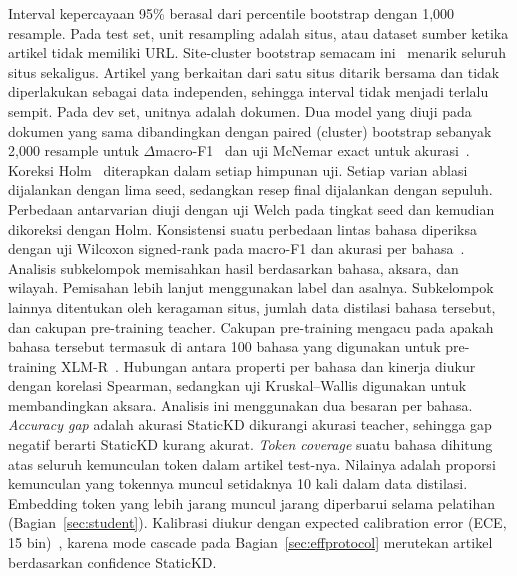 \documentclass[journal]{IEEEtran}
\begin{document}
Interval kepercayaan 95\% berasal dari percentile bootstrap dengan 1,000 resample. Pada test set, unit resampling adalah situs, atau dataset sumber ketika artikel tidak memiliki URL. Site-cluster bootstrap semacam ini~\cite{field2007bootstrapping} menarik seluruh situs sekaligus. Artikel yang berkaitan dari satu situs ditarik bersama dan tidak diperlakukan sebagai data independen, sehingga interval tidak menjadi terlalu sempit. Pada dev set, unitnya adalah dokumen. Dua model yang diuji pada dokumen yang sama dibandingkan dengan paired (cluster) bootstrap sebanyak 2,000 resample untuk $\Delta$macro-F1~\cite{koehn2004significance} dan uji McNemar exact untuk akurasi~\cite{mcnemar1947}. Koreksi Holm~\cite{holm1979} diterapkan dalam setiap himpunan uji. Setiap varian ablasi dijalankan dengan lima seed, sedangkan resep final dijalankan dengan sepuluh. Perbedaan antarvarian diuji dengan uji Welch pada tingkat seed dan kemudian dikoreksi dengan Holm. Konsistensi suatu perbedaan lintas bahasa diperiksa dengan uji Wilcoxon signed-rank pada macro-F1 dan akurasi per bahasa~\cite{dror2018hitchhiker}. Analisis subkelompok memisahkan hasil berdasarkan bahasa, aksara, dan wilayah. Pemisahan lebih lanjut menggunakan label dan asalnya. Subkelompok lainnya ditentukan oleh keragaman situs, jumlah data distilasi bahasa tersebut, dan cakupan pre-training teacher. Cakupan pre-training mengacu pada apakah bahasa tersebut termasuk di antara 100 bahasa yang digunakan untuk pre-training XLM-R~\cite{conneau2020xlmr}. Hubungan antara properti per bahasa dan kinerja diukur dengan korelasi Spearman, sedangkan uji Kruskal--Wallis digunakan untuk membandingkan aksara. Analisis ini menggunakan dua besaran per bahasa. \emph{Accuracy gap} adalah akurasi StaticKD dikurangi akurasi teacher, sehingga gap negatif berarti StaticKD kurang akurat. \emph{Token coverage} suatu bahasa dihitung atas seluruh kemunculan token dalam artikel test-nya. Nilainya adalah proporsi kemunculan yang tokennya muncul setidaknya 10 kali dalam data distilasi. Embedding token yang lebih jarang muncul jarang diperbarui selama pelatihan (Bagian~\ref{sec:student}). Kalibrasi diukur dengan expected calibration error (ECE, 15 bin)~\cite{guo2017calibration}, karena mode cascade pada Bagian~\ref{sec:effprotocol} merutekan artikel berdasarkan confidence StaticKD.
\end{document}
